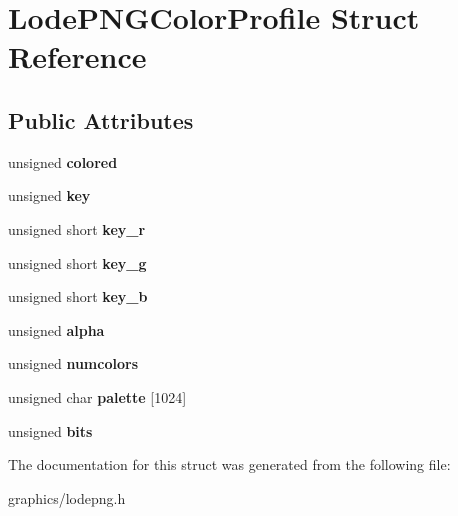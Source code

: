 \hypertarget{struct_lode_p_n_g_color_profile}{\section{Lode\+P\+N\+G\+Color\+Profile Struct Reference}
\label{struct_lode_p_n_g_color_profile}
}
\subsection*{Public Attributes}
\begin{DoxyCompactItemize}
\item 
\hypertarget{struct_lode_p_n_g_color_profile_abf063a566a4ab9f4d71b49764573d610}{unsigned {\bfseries colored}}\label{struct_lode_p_n_g_color_profile_abf063a566a4ab9f4d71b49764573d610}

\item 
\hypertarget{struct_lode_p_n_g_color_profile_a24f19f400a53672340877eefbc837b0c}{unsigned {\bfseries key}}\label{struct_lode_p_n_g_color_profile_a24f19f400a53672340877eefbc837b0c}

\item 
\hypertarget{struct_lode_p_n_g_color_profile_a0398985ae0572ef97e83c33c7486cafd}{unsigned short {\bfseries key\+\_\+r}}\label{struct_lode_p_n_g_color_profile_a0398985ae0572ef97e83c33c7486cafd}

\item 
\hypertarget{struct_lode_p_n_g_color_profile_aba03e973374bd15315b8c01b86e94e8f}{unsigned short {\bfseries key\+\_\+g}}\label{struct_lode_p_n_g_color_profile_aba03e973374bd15315b8c01b86e94e8f}

\item 
\hypertarget{struct_lode_p_n_g_color_profile_a39b65ec69f6aaee3ee7312a993f21e40}{unsigned short {\bfseries key\+\_\+b}}\label{struct_lode_p_n_g_color_profile_a39b65ec69f6aaee3ee7312a993f21e40}

\item 
\hypertarget{struct_lode_p_n_g_color_profile_a554fea329af8034e91e1cdd8c1af0d90}{unsigned {\bfseries alpha}}\label{struct_lode_p_n_g_color_profile_a554fea329af8034e91e1cdd8c1af0d90}

\item 
\hypertarget{struct_lode_p_n_g_color_profile_afdce0f5fbec46d6b8f1ec63da0a285f9}{unsigned {\bfseries numcolors}}\label{struct_lode_p_n_g_color_profile_afdce0f5fbec46d6b8f1ec63da0a285f9}

\item 
\hypertarget{struct_lode_p_n_g_color_profile_a223f8bee4c9ae8be0b70cc08f19aaead}{unsigned char {\bfseries palette} \mbox{[}1024\mbox{]}}\label{struct_lode_p_n_g_color_profile_a223f8bee4c9ae8be0b70cc08f19aaead}

\item 
\hypertarget{struct_lode_p_n_g_color_profile_a1d3870b03dfe6d699bf4c968c9bc1890}{unsigned {\bfseries bits}}\label{struct_lode_p_n_g_color_profile_a1d3870b03dfe6d699bf4c968c9bc1890}

\end{DoxyCompactItemize}


The documentation for this struct was generated from the following file\+:\begin{DoxyCompactItemize}
\item 
graphics/lodepng.\+h\end{DoxyCompactItemize}
